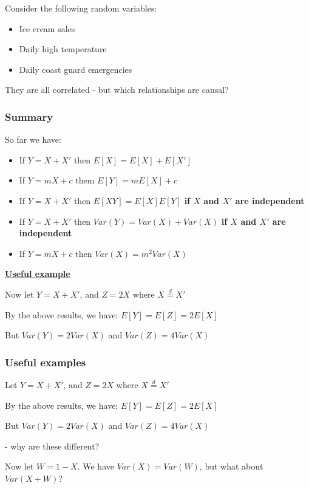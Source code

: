 \documentclass[t,8pt]{beamer}%
\begin{document}
\begin{frame}
\begin{center}
\end{center}
Consider the following random variables:
    \begin{itemize}
        \item Ice cream sales
        \item Daily high temperature
        \item Daily coast guard emergencies
    \end{itemize}
    They are all correlated - but which relationships are causal?
\end{frame}

\begin{frame}
    \frametitle{Summary}
    So far we have:
    \begin{itemize}
        \item If $Y=X+X'$ then $E[X]=E[X]+E[X']$
        \item If $Y=mX+c$ them $E[Y]=mE[X]+c$
        \item If $Y=X+X'$ then $E[XY]=E[X]E[Y]$ {\bf if $X$ and $X'$ are independent}
        \item If $Y=X+X'$ then $Var(Y)=Var(X)+Var(X)$ {\bf if $X$ and $X'$ are independent}
        \item If $Y=mX+c$ then $Var(X)=m^2Var(X)$
    \end{itemize}
    {\bf\underline{Useful example}} \par 
    Now let $Y=X+X'$, and $Z=2X$ where $X\stackrel{d}{=}X'$ \par
    By the above results, we have: $E[Y]=E[Z]=2E[X]$ \par
    But $Var(Y)=2Var(X)$ and $Var(Z)=4Var(X)$
\end{frame}

\begin{frame}
    \frametitle{Useful examples}
    Let $Y=X+X'$, and $Z=2X$ where $X\stackrel{d}{=}X'$ \par
    By the above results, we have: $E[Y]=E[Z]=2E[X]$ \par
    But $Var(Y)=2Var(X)$ and $Var(Z)=4Var(X)$ \par
    - why are these different? \par
    Now let $W=1-X$. We have $Var(X)=Var(W)$, but what about $Var(X+W)$?
\end{frame}
\end{document}
